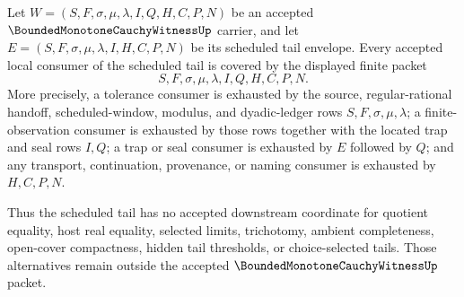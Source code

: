 \begin{theorem}
\label{thm:bounded-monotone-cauchy-witness-scheduled-tail-downstream-coverage}
Let $W=(S,F,\sigma,\mu,\lambda,I,Q,H,C,P,N)$ be an accepted $\BoundedMonotoneCauchyWitnessUp$ carrier, and let $E=(S,F,\sigma,\mu,\lambda,I,H,C,P,N)$ be its scheduled tail envelope. Every accepted local consumer of the scheduled tail is covered by the displayed finite packet
$$
S,F,\sigma,\mu,\lambda,I,Q,H,C,P,N.
$$
More precisely, a tolerance consumer is exhausted by the source, regular-rational handoff, scheduled-window, modulus, and dyadic-ledger rows $S,F,\sigma,\mu,\lambda$; a finite-observation consumer is exhausted by those rows together with the located trap and seal rows $I,Q$; a trap or seal consumer is exhausted by $E$ followed by $Q$; and any transport, continuation, provenance, or naming consumer is exhausted by $H,C,P,N$.

Thus the scheduled tail has no accepted downstream coordinate for quotient equality, host real equality, selected limits, trichotomy, ambient completeness, open-cover compactness, hidden tail thresholds, or choice-selected tails. Those alternatives remain outside the accepted $\BoundedMonotoneCauchyWitnessUp$ packet.
\end{theorem}
